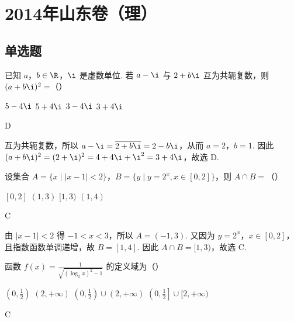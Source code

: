\chapter{2014年山东卷（理）}

\section{单选题}

\begin{problem}
已知 \(a\)，\(b \in \R\)，\(\i\) 是虚数单位. 若 \(a - \i\) 与 \(2 + b\i\) 互为共轭复数，则 \((a + b\i)^2 =\)（\quad）

\choices
    {\(5 - 4\i\)}
    {\(5 + 4\i\)}
    {\(3 - 4\i\)}
    {\(3 + 4\i\)}
\end{problem}

\begin{answer}
D
\end{answer}

\begin{solution}
互为共轭复数，所以
\(a-\i=\overline{2+b\i}=2-b\i\)，从而 \(a=2\)，\(b=1\). 因此
\((a+b\i)^2=(2+\i)^2=4+4\i+\i^2=3+4\i\)，故选 D.
\end{solution}

\begin{problem}
设集合 \(A = \{x \mid |x - 1| < 2\}\)，\(B = \{y \mid y = 2^x, x \in [0,2]\}\)，则 \(A \cap B =\)（\quad）

\choices
    {\([0,2]\)}
    {\((1,3)\)}
    {\([1,3)\)}
    {\((1,4)\)}
\end{problem}

\begin{answer}
C
\end{answer}

\begin{solution}
由 \(|x-1|<2\) 得 \(-1<x<3\)，所以 \(A=(-1,3)\). 又因为 \(y=2^x\)，\(x\in[0,2]\)，且指数函数单调递增，故 \(B=[1,4]\). 因此
\(A\cap B=[1,3)\)，故选 C.
\end{solution}

\begin{problem}
函数 \( f(x) = \frac{1}{\sqrt{(\log_2x)^2 - 1}} \) 的定义域为（\quad）

\choices
    {\(\left(0, \frac{1}{2}\right)\)}
    {\((2, +\infty)\)}
    {\(\left(0, \frac{1}{2}\right) \cup (2, +\infty)\)}
    {\(\left(0, \frac{1}{2}\right] \cup [2, +\infty)\)}
\end{problem}

\begin{answer}
C
\end{answer}

